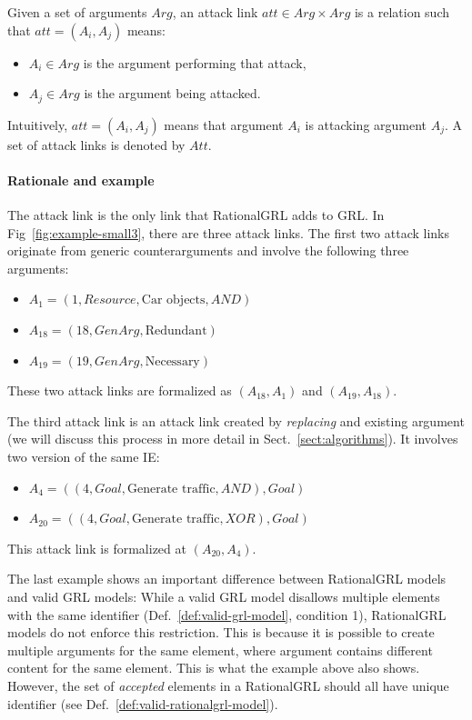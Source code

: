 \begin{definition}
\label{def:link:attack}
Given a set of arguments $Arg$, an attack link $att\in Arg\times Arg$ is a relation such that $att=(A_i,A_j)$ means:
\begin{itemize}
\item $A_i\in Arg$ is the argument performing that attack,
\item $A_j\in Arg$ is the argument being attacked.
\end{itemize}
Intuitively, $att=(A_i,A_j)$ means that argument $A_i$ is attacking argument $A_j$. A set of attack links is denoted by $Att$.
\end{definition}

\paragraph{Rationale and example} The attack link is the only link that RationalGRL adds to GRL. In Fig~\ref{fig:example-small3}, there are three attack links. The first two attack links originate from generic counterarguments and involve the following three arguments:
\begin{itemize}
\item $A_1 = (1, Resource, \text{Car objects}, AND)$
\item $A_{18} = (18, GenArg, \text{Redundant})$
\item $A_{19} = (19, GenArg, \text{Necessary})$
\end{itemize}

These two attack links are formalized as $(A_{18},A_{1})$ and $(A_{19}, A_{18})$.

The third attack link is an attack link created by \emph{replacing} and existing argument (we will discuss this process in more detail in Sect.~\ref{sect:algorithms}). It involves two version of the same IE:
\begin{itemize}
\item $A_{4} = ((4, Goal, \text{Generate traffic}, AND), Goal)$
\item $A_{20} = ((4, Goal, \text{Generate traffic}, XOR), Goal)$
\end{itemize}

This attack link is formalized at $(A_{20},A_4)$.

The last example shows an important difference between RationalGRL models and valid GRL models: While a valid GRL model disallows multiple elements with the same identifier (Def.~\ref{def:valid-grl-model}, condition 1), RationalGRL models do not enforce this restriction. This is because it is possible to create multiple arguments for the same element, where argument contains different content for the same element. This is what the example above also shows. However, the set of \emph{accepted} elements in a RationalGRL should all have unique identifier (see Def.~\ref{def:valid-rationalgrl-model}).

